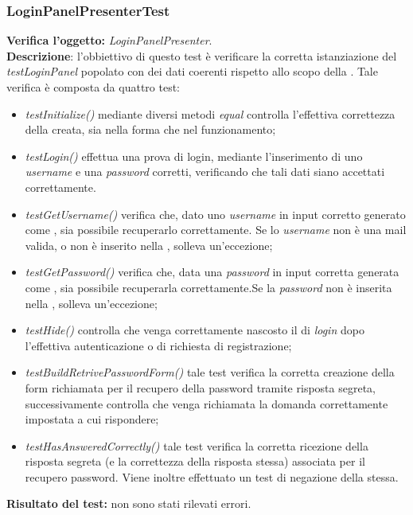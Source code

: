 \subsubsection{LoginPanelPresenterTest}
\textbf{Verifica l'oggetto:} \textit{LoginPanelPresenter}.\\
\textbf{Descrizione}: l'obbiettivo di questo test è verificare la corretta istanziazione del \textit{testLoginPanel} popolato con dei dati coerenti rispetto allo scopo della \underline{}.
Tale verifica è composta da quattro test:
\begin{itemize} 
\item \textit{testInitialize() } mediante diversi metodi \textit{equal} controlla l'effettiva correttezza della  creata, sia nella forma che nel funzionamento;
\item \textit{testLogin() } effettua una prova di login, mediante l'inserimento di uno \textit{username} e una \textit{password} corretti, verificando che tali dati siano accettati correttamente.
\item \textit{testGetUsername() } verifica che, dato uno \textit{username} in input corretto generato come \underline{}, sia possibile recuperarlo correttamente. Se lo \textit{username} non è una mail valida, o non è inserito nella , solleva un'eccezione;
\item \textit{testGetPassword() } verifica che, data una \textit{password} in input corretta generata come , sia possibile recuperarla correttamente.Se la \textit{password} non è inserita nella , solleva un'eccezione;
\item \textit{testHide()} controlla che venga correttamente nascosto il  di \textit{login} dopo l'effettiva autenticazione o di richiesta di registrazione;
\item \textit{testBuildRetrivePasswordForm()} tale test verifica la corretta creazione della form richiamata per il recupero della password tramite risposta segreta, successivamente controlla che venga richiamata la domanda correttamente impostata a cui rispondere;
\item \textit{testHasAnsweredCorrectly()} tale test verifica la corretta ricezione della risposta segreta (e la correttezza della risposta stessa) associata per il recupero password. Viene inoltre effettuato un test di negazione della stessa.
\end{itemize}
\textbf{Risultato del test:} non sono stati rilevati errori.

